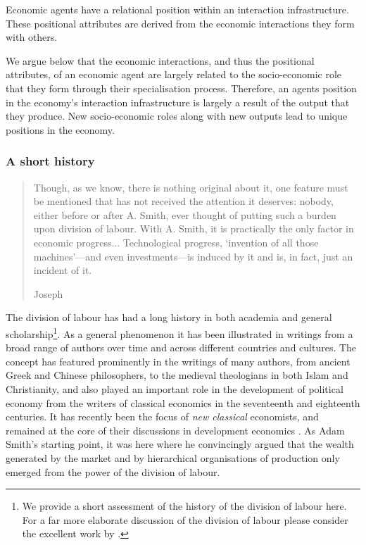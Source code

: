 \begin{lemma} \label{con:positionalattributes}
Economic agents have a relational position within an interaction infrastructure. These positional attributes are derived from the economic interactions they form with others.
\end{lemma}

We argue below that the economic interactions, and thus the positional attributes, of an economic agent are largely related to the socio-economic role that they form through their specialisation process. Therefore, an agents position in the economy's interaction infrastructure is largely a result of the output that they produce. New socio-economic roles along with new outputs lead to unique positions in the economy.

\subsubsection{A short history}

\begin{quote}
Though, as we know, there is nothing original about it, one feature must be mentioned that has not received the attention it deserves: nobody, either before or after A. Smith, ever thought of putting such a burden upon division of labour. With A. Smith, it is practically the only factor in economic progress... Technological progress, `invention of all those machines'---and even investments---is induced by it and is, in fact, just an incident of it.

\begin{flushright}
Joseph \citet[p.~182]{Schumpeter1954}
\end{flushright}
\end{quote}

The division of labour has had a long history in both academia and general scholarship\footnote{We provide a short assessment of the history of the division of labour here. For a far more elaborate discussion of the division of labour please consider the excellent work by \citet{Sun2012}.}. As a general phenomenon it has been illustrated in writings from a broad range of authors over time and across different countries and cultures. The concept has featured prominently in the writings of many authors, from ancient Greek and Chinese philosophers, to the medieval theologians in both Islam and Christianity, and also played an important role in the development of political economy from the writers of classical economics in the seventeenth and eighteenth centuries. It has recently been the focus of \emph{new classical} economists, and remained at the core of their discussions in development economics \citep{Yang2003}. As Adam Smith's starting point, it was here where he convincingly argued that the wealth generated by the market and by hierarchical organisations of production only emerged from the power of the division of labour.


